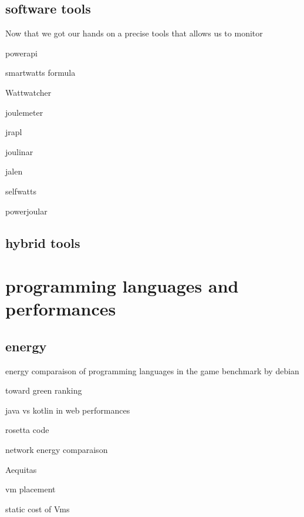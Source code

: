 \subsection{software tools}
Now that we got our hands on a precise tools that allows us to monitor

powerapi \cite{colmant2018next}

smartwatts formula \cite{fieni2020smartwatts}

Wattwatcher \cite{lebeane2015watt}

joulemeter \cite{kothari2009joulemeter}\cite{jagroep2017energy}

jrapl \cite{guimaraes2016some} \cite{liu2015data}

joulinar \cite{islam2016measuring} \cite{noureddine2016jolinar}

jalen \cite{noureddine2015monitoring}

selfwatts \cite{fieni2021selfwatts}

powerjoular \cite{noureddine2022powerjoular}
\subsection{hybrid tools}


\section{programming languages and performances}
\subsection{energy}


energy comparaison of programming languages in the game benchmark by debian \cite{pereira2017energy}

toward green ranking \cite{couto2017towards}

java vs kotlin in web performances \cite{bujnowski2020java}

rosetta code \cite{nanz2015comparative} \cite{mirowski2020rosetta}

network energy comparaison \cite{balasubramanian2009energy}

Aequitas \cite{ribic2016aequitas}

vm placement \cite{mishra2018energy}

\citeauthor{mishra2018energy}

static cost of Vms \cite{kurpicz2016much}



